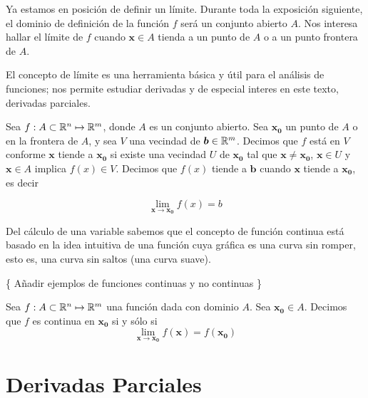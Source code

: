 Ya estamos en posición de definir un límite. Durante toda la exposición siguiente, el dominio de definición de la función $f$ será un conjunto abierto $A$.
Nos interesa hallar el límite de $f$ cuando $\bm{x} \in A$ tienda a un punto de $A$ o a un punto frontera de $A$.

El concepto de límite es una herramienta básica y útil para el análisis de funciones; nos permite estudiar derivadas y de especial interes en este texto,
derivadas parciales.

\begin{definition}[Límite]
    Sea $f:A \subset \mathbb{R}^{n} \mapsto \mathbb{R}^{m}$, donde $A$ es un conjunto abierto. Sea $\bm{x_{0}}$ un punto de $A$ o en la frontera de $A$, y sea
    $V$ una vecindad de $\bm{b} \in \mathbb{R}^{m}$. Decimos que $f$ está en $V$ conforme $\bm{x}$ tiende a $\bm{x_{0}}$ si existe una vecindad $U$ de 
    $\bm{x_{0}}$ tal que $\bm{x} \neq \bm{x_{0}}$, $\bm{x} \in U$ y $\bm{x} \in A$ implica $f(x) \in V$. Decimos que $f(x)$ tiende a $\bm{b}$ cuando
    $\bm{x}$ tiende a $\bm{x_{0}}$, es decir

    $$ \lim_{\bm{x} \rightarrow \bm{x_{0}}} f(x) = b $$
\end{definition}

Del cálculo de una variable sabemos que el concepto de función continua está basado en la idea intuitiva de una función cuya gráfica es una
curva sin romper, esto es, una curva sin saltos (una curva suave).

\{ Añadir ejemplos de funciones continuas y no continuas \}

\begin{definition}
    Sea $f:A \subset \mathbb{R}^{n} \mapsto \mathbb{R}^{m}$ una función dada con dominio $A$. Sea $\bm{x_{0}} \in A$. Decimos que $f$ es continua
    en $\bm{x_{0}}$ si y sólo si
    $$ \lim_{\bm{x} \rightarrow \bm{x_{0}}} f(\bm{x}) = f(\bm{x_{0}})$$
\end{definition}

\section{Derivadas Parciales}





